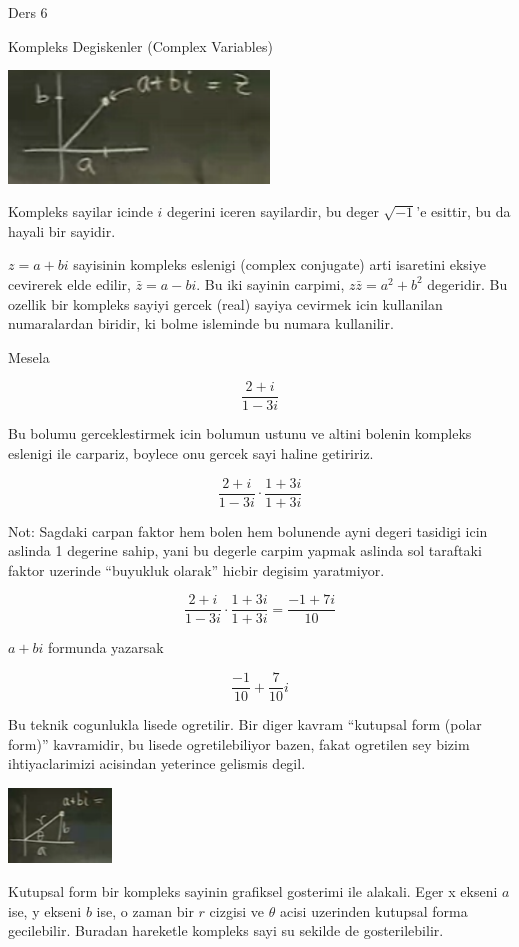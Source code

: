 \documentclass[12pt,fleqn]{article}\usepackage{../common}
\begin{document}
Ders 6

Kompleks Degiskenler (Complex Variables)

\includegraphics[height=3cm]{6_1.png}

Kompleks sayilar icinde $i$ degerini iceren sayilardir, bu deger
$\sqrt{-1}$'e esittir, bu da hayali bir sayidir. 

$z=a+bi$ sayisinin kompleks eslenigi (complex conjugate) arti
isaretini eksiye cevirerek elde edilir, $\bar{z}=a-bi$. Bu iki sayinin
carpimi, $z\bar{z} = a^2+b^2$ degeridir. Bu ozellik bir kompleks sayiyi
gercek (real) sayiya cevirmek icin kullanilan numaralardan biridir, ki
bolme isleminde bu numara kullanilir.

Mesela

\[ \frac{2+i}{1-3i} \]

Bu bolumu gerceklestirmek icin bolumun ustunu ve altini bolenin kompleks
eslenigi ile carpariz, boylece onu gercek sayi haline getiririz.

\[ \frac{2+i}{1-3i} \cdot \frac{1+3i}{1+3i}\]

Not: Sagdaki carpan faktor hem bolen hem bolunende ayni degeri tasidigi
icin aslinda 1 degerine sahip, yani bu degerle carpim yapmak aslinda sol
taraftaki faktor uzerinde ``buyukluk olarak'' hicbir degisim yaratmiyor.

\[ \frac{2+i}{1-3i} \cdot \frac{1+3i}{1+3i} = \frac{-1+7i}{10}\]


$a+bi$ formunda yazarsak

\[ \frac{-1}{10} + \frac{7}{10}i \]

Bu teknik cogunlukla lisede ogretilir. Bir diger kavram ``kutupsal form
(polar form)'' kavramidir, bu lisede ogretilebiliyor bazen, fakat ogretilen
sey bizim ihtiyaclarimizi acisindan yeterince gelismis degil. 

\includegraphics[height=2cm]{6_2.png}

Kutupsal form bir kompleks sayinin grafiksel gosterimi ile alakali. Eger x
ekseni $a$ ise, y ekseni $b$ ise, o zaman bir $r$ cizgisi ve $\theta$ acisi
uzerinden kutupsal forma gecilebilir. Buradan hareketle kompleks sayi su
sekilde de gosterilebilir. 
\end{document}
